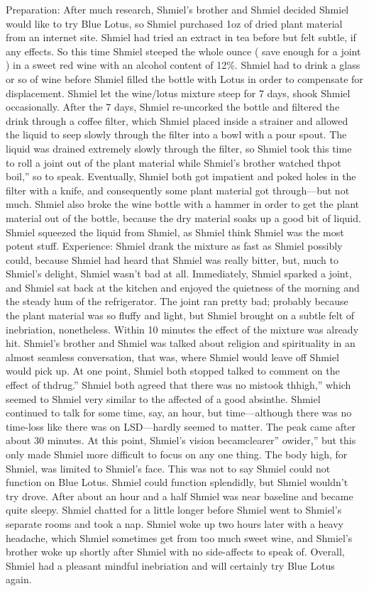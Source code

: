 \documentclass[12pt]{book}
\begin{document}
Preparation: After much research, Shmiel's brother and Shmiel decided Shmiel would like to try Blue Lotus, so Shmiel purchased 1oz of dried plant material from an internet site. Shmiel had tried an extract in tea before but felt subtle, if any effects. So this time Shmiel steeped the whole ounce ( save enough for a joint ) in a sweet red wine with an alcohol content of 12\%. Shmiel had to drink a glass or so of wine before Shmiel filled the bottle with Lotus in order to compensate for displacement. Shmiel let the wine/lotus mixture steep for 7 days, shook Shmiel occasionally. After the 7 days, Shmiel re-uncorked the bottle and filtered the drink through a coffee filter, which Shmiel placed inside a strainer and allowed the liquid to seep slowly through the filter into a bowl with a pour spout. The liquid was drained extremely slowly through the filter, so Shmiel took this time to roll a joint out of the plant material while Shmiel's brother watched thpot boil,'' so to speak. Eventually, Shmiel both got impatient and poked holes in the filter with a knife, and consequently some plant material got through---but not much. Shmiel also broke the wine bottle with a hammer in order to get the plant material out of the bottle, because the dry material soaks up a good bit of liquid. Shmiel squeezed the liquid from Shmiel, as Shmiel think Shmiel was the most potent stuff. Experience: Shmiel drank the mixture as fast as Shmiel possibly could, because Shmiel had heard that Shmiel was really bitter, but, much to Shmiel's delight, Shmiel wasn't bad at all. Immediately, Shmiel sparked a joint, and Shmiel sat back at the kitchen and enjoyed the quietness of the morning and the steady hum of the refrigerator. The joint ran pretty bad; probably because the plant material was so fluffy and light, but Shmiel brought on a subtle felt of inebriation, nonetheless. Within 10 minutes the effect of the mixture was already hit. Shmiel's brother and Shmiel was talked about religion and spirituality in an almost seamless conversation, that was, where Shmiel would leave off Shmiel would pick up. At one point, Shmiel both stopped talked to comment on the effect of thdrug.'' Shmiel both agreed that there was no mistook thhigh,'' which seemed to Shmiel very similar to the affected of a good absinthe. Shmiel continued to talk for some time, say, an hour, but time---although there was no time-loss like there was on LSD---hardly seemed to matter. The peak came after about 30 minutes. At this point, Shmiel's vision becamclearer'' owider,'' but this only made Shmiel more difficult to focus on any one thing. The body high, for Shmiel, was limited to Shmiel's face. This was not to say Shmiel could not function on Blue Lotus. Shmiel could function splendidly, but Shmiel wouldn't try drove. After about an hour and a half Shmiel was near baseline and became quite sleepy. Shmiel chatted for a little longer before Shmiel went to Shmiel's separate rooms and took a nap. Shmiel woke up two hours later with a heavy headache, which Shmiel sometimes get from too much sweet wine, and Shmiel's brother woke up shortly after Shmiel with no side-affects to speak of. Overall, Shmiel had a pleasant mindful inebriation and will certainly try Blue Lotus again.
\end{document}
